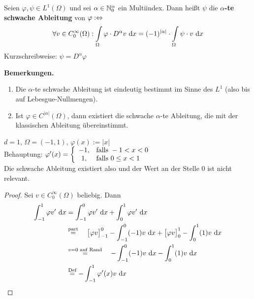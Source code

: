 \begin{definition}
Seien $\varphi,\psi\in L^1(\Omega)$ und sei $\alpha\in\mathbb{N}_0^\alpha$ ein Multiindex. Dann heißt $\psi$ die \textbf{$\alpha$-te schwache Ableitung} von $\varphi:\Leftrightarrow$
\begin{align*}
\forall v\in C_0^\infty(\Omega):\int\limits_\Omega\varphi\cdot D^\alpha v\text{ d} x=(-1)^{|\alpha|}\cdot\int\limits_\Omega\psi\cdot v\text{ d} x
\end{align*}
Kurzschreibweise: $\psi=D^\alpha\varphi$
\end{definition}

\textbf{Bemerkungen.}
\begin{enumerate}
\item Die $\alpha$-te schwache Ableitung ist eindeutig bestimmt im Sinne des $L^1$ (also bis auf Lebesgue-Nullmengen).
\item Ist $\varphi\in C^{|\alpha|}(\Omega)$, dann existiert die schwache $\alpha$-te 	Ableitung, die mit der klassischen Ableitung übereinstimmt.
\end{enumerate}

\begin{beisp}
$d=1$, $\Omega=(-1,1)$, $\varphi(x):=|x|$\\
Behauptung: $\varphi'(x)=\left\lbrace\begin{array}{cl}
-1, & \text{falls } -1<x<0\\
1, & \text{falls } 0\leq x<1
\end{array}\right.$\\
Die schwache Ableitung existiert also und der Wert an der Stelle 0 ist nicht relevant.
\begin{proof}
	Sei $v \in C_0^\infty(\Omega)$ beliebig. Dann
	\begin{align*}
		\int_{-1}^1 \varphi v' \text{ d} x &= \int_{-1}^0 \varphi v' \text{ d} x + \int_{0}^1 \varphi v' \text{ d} x \\
															&\stackrel{\text{part}}{=} ~~~ \big[\varphi v\big]_{-1}^0 - \int_{-1}^0 (-1) v \text{ d} x + \big[\varphi v\big]_{0}^1 - \int_{0}^1 (1) v \text{ d} x \\
															&\stackrel{v = 0 \text{ auf Rand}}{=} ~~~ - \int_{-1}^0 (-1) v \text{ d} x - \int_{0}^1 (1) v \text{ d} x \\
															&\stackrel{\text{Def}}{=} - \int_{-1}^1 \varphi'(x)v\text{ d} x
	\end{align*}
\end{proof}
\end{beisp}

